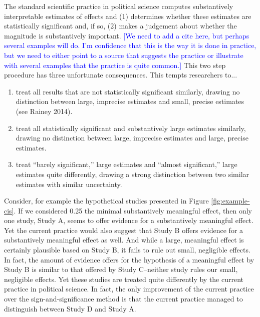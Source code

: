 \documentclass[12pt]{article}
\newcommand{\kelly}[1]{\textcolor{blue}{#1}}
\begin{document}
The standard scientific practice in political science computes substantively interpretable estimates of effects and (1) determines whether these estimates are statistically significant and, if so, (2) makes a judgement about whether the magnitude is substantively important. \kelly{[We need to add a cite here, but perhaps several examples will do. I'm confidence that this is the way it is done in practice, but we need to either point to a source that suggests the practice or illustrate with several examples that the practice is quite common.]} This two step procedure has three unfortunate consequences. This tempts researchers to...

\begin{enumerate}
\item treat all results that are not statistically significant similarly, drawing no distinction between large, imprecise estimates and small, precise estimates (see Rainey 2014).
\item treat all statistically significant and substantively large estimates similarly, drawing no distinction between large, imprecise estimates and large, precise estimates.
\item treat ``barely significant,'' large estimates and ``almost significant,'' large estimates quite differently, drawing a strong distinction between two similar estimates with similar uncertainty.
\end{enumerate}

Consider, for example the hypothetical studies presented in Figure \ref{fig:example-cis}. If we considered 0.25 the minimal substantively meaningful effect, then only one study, Study A, seems to offer evidence for a substantively meaningful effect. Yet the current practice would also suggest that Study B offers evidence for a substantively meaningful effect as well. And while a large, meaningful effect is certainly plausible based on Study B, it fails to rule out small, negligible effects. In fact, the amount of evidence offers for the hypothesis of a meaningful effect by Study B is similar to that offered by Study C--neither study rules our small, negligible effects. Yet these studies are treated quite differently by the current practice in political science. In fact, the only improvement of the current practice over the sign-and-significance method is that the current practice managed to distinguish between Study D and Study A.
\end{document}
